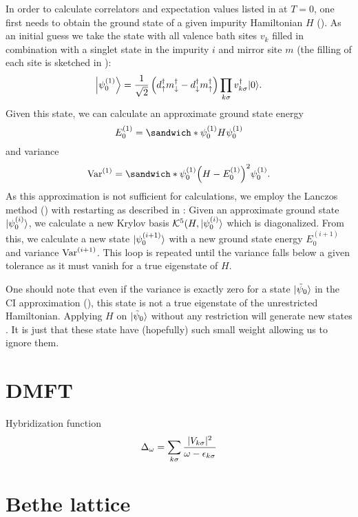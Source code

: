 In order to calculate correlators and expectation values listed in
 at $T=0$,
one first needs to obtain the ground state of a given impurity Hamiltonian $H$
().
As an initial guess we take the state with all valence bath sites $v_k$ filled in combination with
a singlet state in the impurity $i$ and mirror site $m$
(the filling of each site is sketched in ):
\begin{equation}
    \ket*{\psi_0^{(1)}}
    =
    \frac{1}{\sqrt{2}}
    \left(d^\dag_\uparrow m^\dag_\downarrow - d^\dag_\downarrow m^\dag_\uparrow\right)
    \prod_{k\sigma} v^\dag_{k\sigma}
    \ket{0}.
\end{equation}
Given this state, we can calculate an approximate ground state energy
\begin{equation}
    E_0^{(1)} = \sandwich*{\psi_0^{(1)}}{H}{\psi_0^{(1)}}
\end{equation}
and variance
\begin{equation}
    \var^{(1)}
    =
    \sandwich*{\psi_0^{(1)}}{\left(H - E_0^{(1)}\right)^2}{\psi_0^{(1)}}.
\end{equation}
As this approximation is not sufficient for calculations,
we employ the Lanczos method () with restarting
as described in \cite{Lu2014}:
Given an approximate ground state $\ket{\psi_0^{(i)}}$,
we calculate a new Krylov basis $\mathcal{K}^5(H, \ket{\psi_0^{(i)}}$ which is diagonalized.
From this, we calculate a new state $\ket{\psi_0^{(i+1)}}$
with a new ground state energy $E_0^{(i+1)}$
and variance $\var^{(i+1)}$.
This loop is repeated until the variance falls below a given tolerance
as it must vanish for a true eigenstate of $H$.

One should note that even if the variance is exactly zero for a state $\ket{\tilde\psi_0}$
in the CI approximation (),
this state is not a true eigenstate of the unrestricted Hamiltonian.
Applying $H$ on $\ket{\tilde\psi_0}$ without any restriction
will generate new states \cite{Lu2014}.
It is just that these state have (hopefully) such small weight allowing us to ignore them.

\section{DMFT}

Hybridization function
\begin{align}
    \Delta_\omega = \sum_{k\sigma} \frac{\abs{V_{k\sigma}}^2}{\omega - \epsilon_{k\sigma}}
\end{align}

\section{Bethe lattice}

